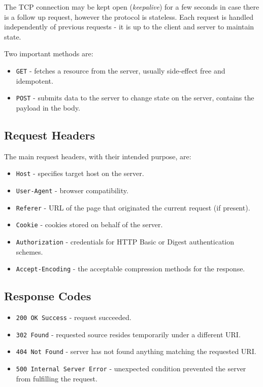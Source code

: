 \documentclass[11pt]{article}
\begin{document}
The TCP connection may be kept open (\textit{keepalive}) for a few seconds in case there is a follow up request, however the protocol is stateless.
Each request is handled independently of previous requests - it is up to the client and server to maintain state.

Two important methods are:
\begin{itemize}
  \item \texttt{GET} - fetches a resource from the server, usually side-effect free and idempotent.
  \item \texttt{POST} - submits data to the server to change state on the server, contains the payload in the body.
\end{itemize}

\subsection{Request Headers}
The main request headers, with their intended purpose, are:
\begin{itemize}
  \item \texttt{Host} - specifies target host on the server.
  \item \texttt{User-Agent} - browser compatibility.
  \item \texttt{Referer} - URL of the page that originated the current request (if present).
  \item \texttt{Cookie} - cookies stored on behalf of the server.
  \item \texttt{Authorization} - credentials for HTTP Basic or Digest authentication schemes.
  \item \texttt{Accept-Encoding} - the acceptable compression methods for the response.
\end{itemize}

\subsection{Response Codes}
\begin{itemize}
  \item \texttt{200 OK Success} - request succeeded.
  \item \texttt{302 Found} - requested source resides temporarily under a different URI.
  \item \texttt{404 Not Found} - server has not found anything matching the requested URI.
  \item \texttt{500 Internal Server Error} - unexpected condition prevented the server from fulfilling the request.
\end{itemize}
\end{document}

